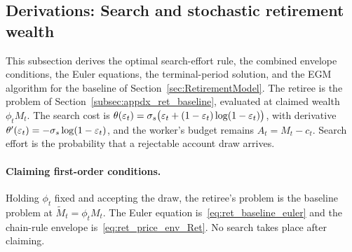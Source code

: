 \subsection{Derivations: Search and stochastic retirement wealth}\label{subsec:appdx_ret_full}
This subsection derives the optimal search-effort rule, the combined envelope conditions, the Euler equations, the terminal-period solution, and the EGM algorithm for the baseline of Section~\ref{sec:RetirementModel}. The retiree is the problem of Section~\ref{subsec:appdx_ret_baseline}, evaluated at claimed wealth $\phi_t M_t$. The search cost is $\theta(\varepsilon_t)=\sigma_s\bigl(\varepsilon_t+(1-\varepsilon_t)\log(1-\varepsilon_t)\bigr)$, with derivative $\theta'(\varepsilon_t)=-\sigma_s\log(1-\varepsilon_t)$, and the worker's budget remains $A_t=M_t-c_t$. Search effort is the probability that a rejectable account draw arrives.

\paragraph{Claiming first-order conditions.}
Holding $\phi_t$ fixed and accepting the draw, the retiree's problem is the baseline problem at $\tilde M_t=\phi_t M_t$. The Euler equation is~\eqref{eq:ret_baseline_euler} and the chain-rule envelope is~\eqref{eq:ret_price_env_Ret}. No search takes place after claiming.

